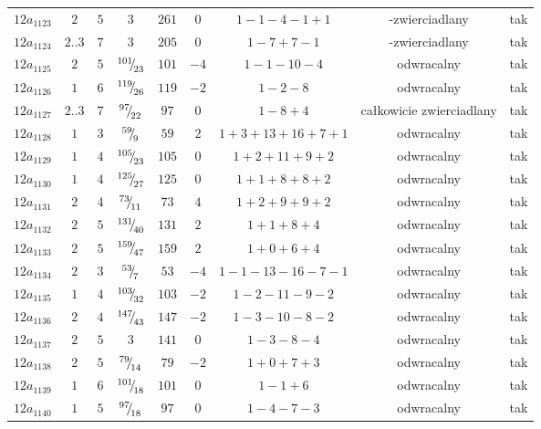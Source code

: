 \begin{longtable}{ccccccccc}
$12a_{1123}$ & $2$ & $5$ & $3$ & $261$ & $0$ & $1-1-4-1+1$ & -zwierciadlany & tak \\
$12a_{1124}$ & $2..3$ & $7$ & $3$ & $205$ & $0$ & $1-7+7-1$ & -zwierciadlany & tak \\
$12a_{1125}$ & $2$ & $5$ & ${}^{101}{\mskip -5mu/\mskip -3mu}_{23}$ & $101$ & $-4$ & $1-1-10-4$ & odwracalny & tak \\
$12a_{1126}$ & $1$ & $6$ & ${}^{119}{\mskip -5mu/\mskip -3mu}_{26}$ & $119$ & $-2$ & $1-2-8$ & odwracalny & tak \\
$12a_{1127}$ & $2..3$ & $7$ & ${}^{97}{\mskip -5mu/\mskip -3mu}_{22}$ & $97$ & $0$ & $1-8+4$ & całkowicie zwierciadlany & tak \\
$12a_{1128}$ & $1$ & $3$ & ${}^{59}{\mskip -5mu/\mskip -3mu}_{9}$ & $59$ & $2$ & $1+3+13+16+7+1$ & odwracalny & tak \\
$12a_{1129}$ & $1$ & $4$ & ${}^{105}{\mskip -5mu/\mskip -3mu}_{23}$ & $105$ & $0$ & $1+2+11+9+2$ & odwracalny & tak \\
$12a_{1130}$ & $1$ & $4$ & ${}^{125}{\mskip -5mu/\mskip -3mu}_{27}$ & $125$ & $0$ & $1+1+8+8+2$ & odwracalny & tak \\
$12a_{1131}$ & $2$ & $4$ & ${}^{73}{\mskip -5mu/\mskip -3mu}_{11}$ & $73$ & $4$ & $1+2+9+9+2$ & odwracalny & tak \\
$12a_{1132}$ & $2$ & $5$ & ${}^{131}{\mskip -5mu/\mskip -3mu}_{40}$ & $131$ & $2$ & $1+1+8+4$ & odwracalny & tak \\
$12a_{1133}$ & $2$ & $5$ & ${}^{159}{\mskip -5mu/\mskip -3mu}_{47}$ & $159$ & $2$ & $1+0+6+4$ & odwracalny & tak \\
$12a_{1134}$ & $2$ & $3$ & ${}^{53}{\mskip -5mu/\mskip -3mu}_{7}$ & $53$ & $-4$ & $1-1-13-16-7-1$ & odwracalny & tak \\
$12a_{1135}$ & $1$ & $4$ & ${}^{103}{\mskip -5mu/\mskip -3mu}_{32}$ & $103$ & $-2$ & $1-2-11-9-2$ & odwracalny & tak \\
$12a_{1136}$ & $2$ & $4$ & ${}^{147}{\mskip -5mu/\mskip -3mu}_{43}$ & $147$ & $-2$ & $1-3-10-8-2$ & odwracalny & tak \\
$12a_{1137}$ & $2$ & $5$ & $3$ & $141$ & $0$ & $1-3-8-4$ & odwracalny & tak \\
$12a_{1138}$ & $2$ & $5$ & ${}^{79}{\mskip -5mu/\mskip -3mu}_{14}$ & $79$ & $-2$ & $1+0+7+3$ & odwracalny & tak \\
$12a_{1139}$ & $1$ & $6$ & ${}^{101}{\mskip -5mu/\mskip -3mu}_{18}$ & $101$ & $0$ & $1-1+6$ & odwracalny & tak \\
$12a_{1140}$ & $1$ & $5$ & ${}^{97}{\mskip -5mu/\mskip -3mu}_{18}$ & $97$ & $0$ & $1-4-7-3$ & odwracalny & tak \\

\end{longtable}
